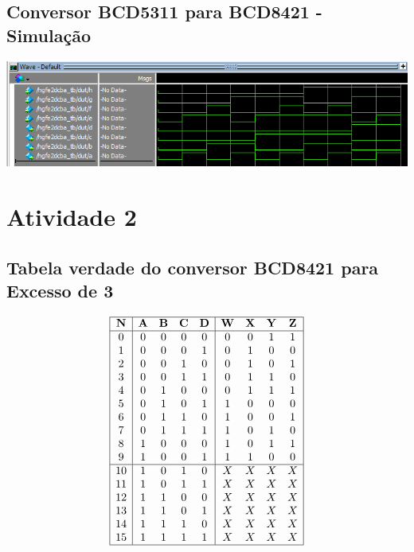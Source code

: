 \documentclass{article}
\begin{document}
\subsection{Conversor BCD5311 para BCD8421 - Simulação}
\includegraphics[width=1\textwidth]{hgfe_wave.png}

\setcounter{section}{2}
\setcounter{subsection}{0}
\section*{Atividade 2}
\subsection{Tabela verdade do conversor BCD8421 para Excesso de 3}
$$\begin{array}{|c|c c c c|c c c c|} \hline \mathbf{N} & \mathbf{A} & \mathbf{B} & \mathbf{C} & \mathbf{D} & \mathbf{W} & \mathbf{X} & \mathbf{Y} & \mathbf{Z} \\ \hline 0 & 0 & 0 & 0 & 0 & 0 & 0 & 1 & 1 \\ 1 & 0 & 0 & 0 & 1 & 0 & 1 & 0 & 0 \\ 2 & 0 & 0 & 1 & 0 & 0 & 1 & 0 & 1 \\ 3 & 0 & 0 & 1 & 1 & 0 & 1 & 1 & 0 \\ 4 & 0 & 1 & 0 & 0 & 0 & 1 & 1 & 1 \\ 5 & 0 & 1 & 0 & 1 & 1 & 0 & 0 & 0 \\ 6 & 0 & 1 & 1 & 0 & 1 & 0 & 0 & 1 \\ 7 & 0 & 1 & 1 & 1 & 1 & 0 & 1 & 0 \\ 8 & 1 & 0 & 0 & 0 & 1 & 0 & 1 & 1 \\ 9 & 1 & 0 & 0 & 1 & 1 & 1 & 0 & 0 \\ \hline 10 & 1 & 0 & 1 & 0 & X & X & X & X \\ 11 & 1 & 0 & 1 & 1 & X & X & X & X \\ 12 & 1 & 1 & 0 & 0 & X & X & X & X \\ 13 & 1 & 1 & 0 & 1 & X & X & X & X \\ 14 & 1 & 1 & 1 & 0 & X & X & X & X \\ 15 & 1 & 1 & 1 & 1 & X & X & X & X \\ \hline \end{array}$$
\end{document}
